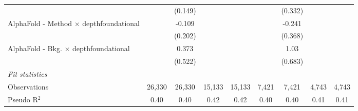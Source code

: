 \begin{tabular}{lcccccccc}
                                                  &               & (0.149)       &        &        &         & (0.332)     &       &   \\   
   AlphaFold - Method $\times$ depthfoundational  &               & -0.109        &        &        &         & -0.241      &       &   \\   
                                                  &               & (0.202)       &        &        &         & (0.368)     &       &   \\   
   AlphaFold - Bkg. $\times$ depthfoundational    &               & 0.373         &        &        &         & 1.03        &       &   \\   
                                                  &               & (0.522)       &        &        &         & (0.683)     &       &   \\   
   \midrule
   \emph{Fit statistics}\\
   Observations                                   & 26,330        & 26,330        & 15,133 & 15,133 & 7,421   & 7,421       & 4,743 & 4,743\\  
   Pseudo R$^2$                                   & 0.40          & 0.40          & 0.42   & 0.42   & 0.40    & 0.40        & 0.41  & 0.41\\  
   

\end{tabular}
